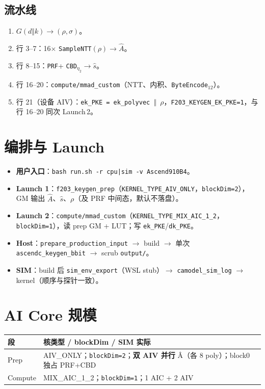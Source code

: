 \documentclass[UTF8,a4paper,11pt]{ctexart}
\begin{document}
\subsection{流水线}

\begin{enumerate}
  \item $G(d\Vert k)\to(\rho,\sigma)$。
  \item 行 3--7：16$\times$ \texttt{SampleNTT}$(\rho)\to\hat{A}$。
  \item 行 8--15：\texttt{PRF}+ \texttt{CBD}$_{\eta_2}\to\hat{s}$。
  \item 行 16--20：\texttt{compute/mmad\_custom}（NTT、内积、\texttt{ByteEncode$_{12}$}）。
  \item 行 21（设备 AIV）：\texttt{ek\_PKE = ek\_polyvec $\Vert$ $\rho$}，\texttt{F203\_KEYGEN\_EK\_PKE=1}，与行 16--20 同次 Launch\,2。
\end{enumerate}

\section{编排与 Launch}
\label{sec:launch}

\begin{itemize}
  \item \textbf{用户入口}：\texttt{bash run.sh -r cpu|sim -v Ascend910B4}。
  \item \textbf{Launch 1}：\texttt{f203\_keygen\_prep}（\texttt{KERNEL\_TYPE\_AIV\_ONLY}，\texttt{blockDim=2}），GM 输出 $\hat{A}$、$\hat{s}$、$\rho$（及 PRF 中间态，默认不落盘）。
  \item \textbf{Launch 2}：\texttt{compute/mmad\_custom}（\texttt{KERNEL\_TYPE\_MIX\_AIC\_1\_2}，\texttt{blockDim=1}），读 prep GM + LUT；写 \texttt{ek\_PKE}/\texttt{dk\_PKE}。
  \item \textbf{Host}：\texttt{prepare\_production\_input} $\to$ build $\to$ 单次 \texttt{ascendc\_keygen\_bbit} $\to$ scrub \texttt{output/}。
  \item \textbf{SIM}：build 后 \texttt{sim\_env\_export}（WSL stub）$\to$ \texttt{camodel\_sim\_log} $\to$ kernel（顺序与探针一致）。
\end{itemize}

\section{AI Core 规模}
\label{sec:aicore}

\begin{longtable}{@{}L{3.2cm}L{10cm}@{}}
\toprule
段 & 核类型 / blockDim / SIM 实际 \\
\midrule
Prep & AIV\_ONLY；\texttt{blockDim=2}；\textbf{双 AIV 并行} \^A（各 8 poly）；block0 独占 PRF+CBD \\
Compute & MIX\_AIC\_1\_2；\texttt{blockDim=1}；1 AIC + 2 AIV \\
\bottomrule
\end{longtable}
\end{document}
